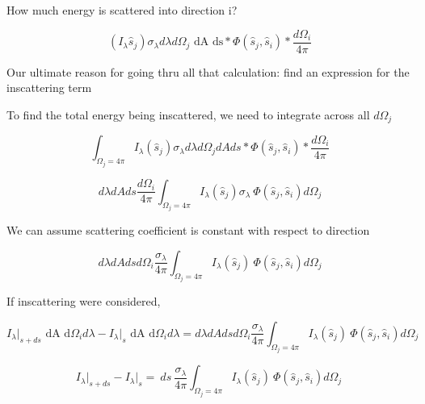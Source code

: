 \documentclass[12pt]{article}
\renewcommand{\_}{\kern-1.5pt\textunderscore\kern-1.5pt}
\begin{document}
How much energy is scattered into direction i?\par

 \[ \left( I_{ \lambda }\hat{s}_{j} \right)  \sigma _{ \lambda }d \lambda  d \Omega _{j}\text{ dA ds}\ast \Phi  \left( \hat{s}_{j},\hat{s}_{i} \right) \ast\frac{d \Omega _{i}}{4 \pi } \] \par

Our ultimate reason for going thru all that calculation: find an expression for the inscattering term\par

To find the total energy being inscattered, we need to integrate across all  \( d \Omega _{j} \) \par

 \[  \int _{ \Omega _{j}=4 \pi }^{}I_{ \lambda } \left( \hat{s}_{j} \right)  \sigma _{ \lambda }d \lambda  d \Omega _{j} dA ds\ast \Phi  \left( \hat{s}_{j},\hat{s}_{i} \right) \ast\frac{d \Omega _{i}}{4 \pi } \] \par

 \[ d \lambda  dA ds\frac{d \Omega _{i}}{4 \pi } \int _{ \Omega _{j}=4 \pi }^{}I_{ \lambda } \left( \hat{s}_{j} \right)  \sigma _{ \lambda }~ \Phi  \left( \hat{s}_{j},\hat{s}_{i} \right) d \Omega _{j} \] \par

We can assume scattering coefficient is constant with respect to direction\par

 \[ d \lambda  dA ds d \Omega _{i}\frac{ \sigma _{ \lambda }}{4 \pi } \int _{ \Omega _{j}=4 \pi }^{}I_{ \lambda } \left( \hat{s}_{j} \right) ~ \Phi  \left( \hat{s}_{j},\hat{s}_{i} \right) d \Omega _{j} \] \par

If inscattering were considered,\par

 \[ I_{ \lambda }\vert _{s+ds}\text{ dA d} \Omega _{i} d \lambda -I_{ \lambda }\vert _{s}\text{ dA d} \Omega _{i} d \lambda =d \lambda  dA ds d \Omega _{i}\frac{ \sigma _{ \lambda }}{4 \pi } \int _{ \Omega _{j}=4 \pi }^{}I_{ \lambda } \left( \hat{s}_{j} \right) ~ \Phi  \left( \hat{s}_{j},\hat{s}_{i} \right) d \Omega _{j}~ \] \par

 \[ I_{ \lambda }\vert _{s+ds} -I_{ \lambda }\vert _{s}=~ds~\frac{ \sigma _{ \lambda }}{4 \pi } \int _{ \Omega _{j}=4 \pi }^{}I_{ \lambda } \left( \hat{s}_{j} \right) ~ \Phi  \left( \hat{s}_{j},\hat{s}_{i} \right) d \Omega _{j}~ \] \par
\end{document}
